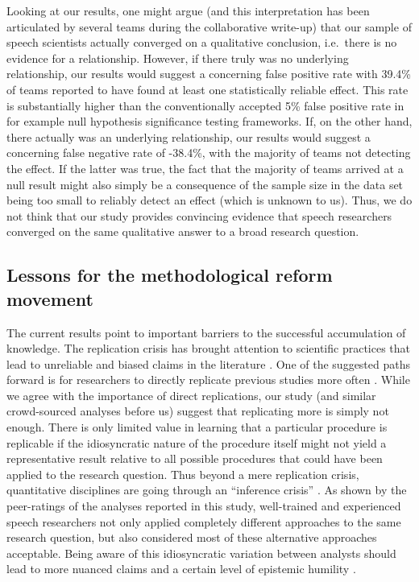 \documentclass[Review,times,sageh]{sagej}
\begin{document}
Looking at our results, one might argue (and this interpretation has been articulated by several teams during the collaborative write-up) that our sample of speech scientists actually converged on a qualitative conclusion, i.e.~there is no evidence for a relationship.
However, if there truly was no underlying relationship, our results would suggest a concerning false positive rate with 39.4\% of teams reported to have found at least one statistically reliable effect.
This rate is substantially higher than the conventionally accepted 5\% false positive rate in for example null hypothesis significance testing frameworks.
If, on the other hand, there actually was an underlying relationship, our results would suggest a concerning false negative rate of -38.4\%, with the majority of teams not detecting the effect.
If the latter was true, the fact that the majority of teams arrived at a null result might also simply be a consequence of the sample size in the data set being too small to reliably detect an effect (which is unknown to us).
Thus, we do not think that our study provides convincing evidence that speech researchers converged on the same qualitative answer to a broad research question.

\hypertarget{lessons-for-the-methodological-reform-movement}{%
\subsection{Lessons for the methodological reform movement}\label{lessons-for-the-methodological-reform-movement}}

The current results point to important barriers to the successful accumulation of knowledge.
The replication crisis has brought attention to scientific practices that lead to unreliable and biased claims in the literature \citep{vazire2017quality, fidler2018reproducibility}.
One of the suggested paths forward is for researchers to directly replicate previous studies more often \citep{open2015estimating, camerer2018evaluating}.
While we agree with the importance of direct replications, our study (and similar crowd-sourced analyses before us) suggest that replicating more is simply not enough.
There is only limited value in learning that a particular procedure is replicable if the idiosyncratic nature of the procedure itself might not yield a representative result relative to all possible procedures that could have been applied to the research question.
Thus beyond a mere replication crisis, quantitative disciplines are going through an ``inference crisis'' \citep{rotello2015more, starns2019assessing}.
As shown by the peer-ratings of the analyses reported in this study, well-trained and experienced speech researchers not only applied completely different approaches to the same research question, but also considered most of these alternative approaches acceptable.
Being aware of this idiosyncratic variation between analysts should lead to more nuanced claims and a certain level of epistemic humility \citep[see][ for an overview of the concept]{campbell1975}.
\end{document}
